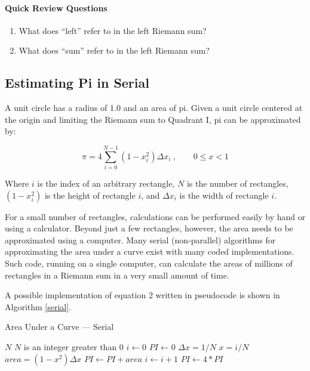 \documentclass[a4paper, 11pt]{article}
\begin{document}
\bigskip
\paragraph{Quick Review Questions}
\begin{enumerate}
\item What does ``left'' refer to in the left Riemann sum?
\item What does ``sum'' refer to in the left Riemann sum?
\end{enumerate}


\subsection{Estimating Pi in Serial}

A unit circle has a radius of 1.0 and an area of pi. Given a unit circle centered at the origin and limiting the Riemann sum to Quadrant I, pi can be approximated by:

\begin{equation}
\label{pi}
	\pi = 4 \sum_{i=0}^{N-1} (1 - x_{i}^2) \Delta x_{i}\ ,\qquad 0 \leq x < 1
\end{equation}

Where $i$ is the index of an arbitrary rectangle, $N$ is the number of rectangles, $(1 - x_{i}^2)$ is the height of rectangle $i$, and $\Delta x_{i}$ is the width of rectangle $i$.

For a small number of rectangles, calculations can be performed easily by hand or using a calculator. Beyond just a few rectangles, however, the area needs to be approximated using a computer. Many serial (non-parallel) algorithms for approximating the area under a curve exist with many coded implementations. Such code, running on a single computer, can calculate the areas of millions of rectangles in a Riemann sum in a very small amount of time.

A possible implementation of equation 2 written in pseudocode is shown in Algorithm \ref{serial}.

\begin{algorithm}
\caption{Area Under a Curve --- Serial}
\label{serial}
\begin{algorithmic}
\Require $N$
\Ensure $N$ is an integer greater than 0
\State $i\gets 0$ 
\State $PI\gets 0$ 
\State $\Delta x = 1 / N$ 
 
\State $x = i / N$ 
\State $area = (1 - x^2) \Delta x$ 
\State $PI \gets PI + area$ 
\State $i\gets i + 1$ 
\EndWhile
\State $PI \gets 4 * PI$ 
\end{algorithmic}
\end{algorithm}
\end{document}
